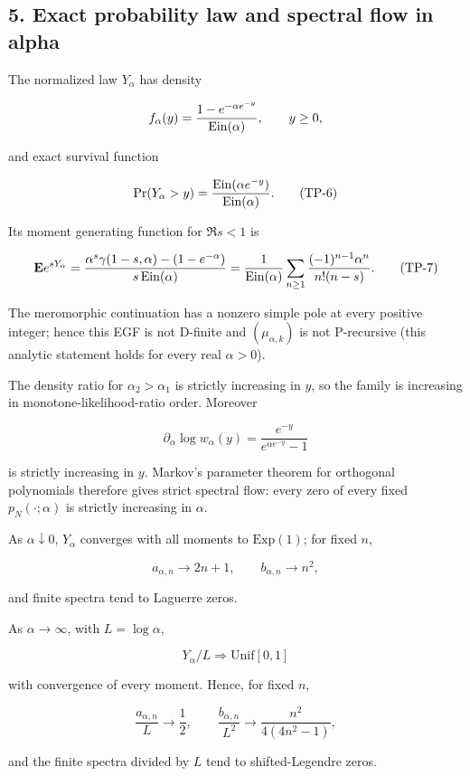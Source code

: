 \subsection{5. Exact probability law and spectral flow in alpha}

The normalized law \(Y_\alpha\) has density

\[
f_\alpha(y)=\frac{1-e^{-\alpha e^{-y}}}{\operatorname{Ein}(\alpha)},\qquad y\ge0,
\]

and exact survival function

\[
\Pr(Y_\alpha>y)=\frac{\operatorname{Ein}(\alpha e^{-y})}{\operatorname{Ein}(\alpha)}. \tag{TP-6}
\]

Its moment generating function for \(\Re s<1\) is

\[
\mathbf E e^{sY_\alpha}
=\frac{\alpha^s\gamma(1-s,\alpha)-(1-e^{-\alpha})}
{s\operatorname{Ein}(\alpha)}
=\frac1{\operatorname{Ein}(\alpha)}\sum_{n\ge1}
\frac{(-1)^{n-1}\alpha^n}{n!(n-s)}. \tag{TP-7}
\]

The meromorphic continuation has a nonzero simple pole at every positive
integer; hence this EGF is not D-finite and \((\mu_{\alpha,k})\) is not
P-recursive (this analytic statement holds for every real \(\alpha>0\)).

The density ratio for \(\alpha_2>\alpha_1\) is strictly increasing in \(y\),
so the family is increasing in monotone-likelihood-ratio order. Moreover

\[
\partial_\alpha\log w_\alpha(y)
=\frac{e^{-y}}{e^{\alpha e^{-y}}-1}
\]

is strictly increasing in \(y\). Markov's parameter theorem for orthogonal
polynomials therefore gives strict spectral flow: every zero of every fixed
\(p_N(\cdot;\alpha)\) is strictly increasing in \(\alpha\).

As \(\alpha\downarrow0\), \(Y_\alpha\) converges with all moments to
\(\mathrm{Exp}(1)\); for fixed \(n\),

\[
a_{\alpha,n}\to2n+1,\qquad b_{\alpha,n}\to n^2,
\]

and finite spectra tend to Laguerre zeros.

As \(\alpha\to\infty\), with \(L=\log\alpha\),

\[
Y_\alpha/L\Longrightarrow\mathrm{Unif}[0,1]
\]

with convergence of every moment. Hence, for fixed \(n\),

\[
\frac{a_{\alpha,n}}L\to\frac12,
\qquad
\frac{b_{\alpha,n}}{L^2}\to\frac{n^2}{4(4n^2-1)},
\]

and the finite spectra divided by \(L\) tend to shifted-Legendre zeros.

